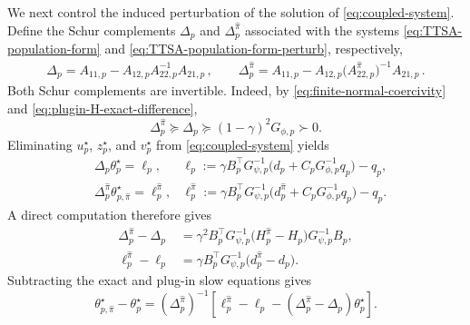 \documentclass{article}
\theoremstyle{definition}
\theoremstyle{remark}
\theoremstyle{plain}
\def\eqsp{\,}
\newcommand{\dsieve}{p}
\numberwithin{equation}{section}
\begin{document}
We next control the induced perturbation of the solution of
\eqref{eq:coupled-system}. Define the Schur complements \(\Delta_\dsieve\) and \(\Delta_\dsieve^{\widehat\pi}\) associated with the systems \eqref{eq:TTSA-population-form} and \eqref{eq:TTSA-population-form-perturb}, respectively,
\begin{align}
    \Delta_\dsieve = A_{11,\dsieve} - A_{12,\dsieve} A_{22, \dsieve}^{-1} A_{21,\dsieve}\eqsp, \qquad \Delta_\dsieve^{\widehat\pi} = A_{11,\dsieve} - A_{12,\dsieve} \big(A_{22, \dsieve}^{\widehat\pi}\big)^{-1} A_{21,\dsieve}\eqsp.
\end{align}
Both Schur complements are invertible. Indeed, by \eqref{eq:finite-normal-coercivity} and \eqref{eq:plugin-H-exact-difference}, 
\begin{equation}
\label{eq:plugin-Schur-stability}
    \Delta_\dsieve^{\widehat\pi}
    \succeq
    \Delta_\dsieve
    \succeq
    (1-\gamma)^2G_{\phi,\dsieve}
    \succ0.
\end{equation}
Eliminating \(u_\dsieve^\star\), \(z_\dsieve^\star\), and
\(v_\dsieve^\star\) from \eqref{eq:coupled-system} yields
\begin{align}
\label{eq:eliminated-slow-equation}
&\Delta_\dsieve\theta_\dsieve^\star
    =
    \ell_\dsieve,
    &\ell_\dsieve
    :=
    \gamma
    B_\dsieve^\top
    G_{\psi,\dsieve}^{-1}
    \bigl(
        d_\dsieve+C_\dsieve G_{\phi,\dsieve}^{-1}q_\dsieve
    \bigr)
    -
    q_\dsieve, \\ 
&\Delta_\dsieve^{\widehat\pi}
\theta_{\dsieve,\widehat\pi}^\star= \ell_\dsieve^{\widehat\pi}, &\ell_\dsieve^{\widehat \pi}
    :=
    \gamma
    B_\dsieve^\top
    G_{\psi,\dsieve}^{-1}
    \bigl(
        d_\dsieve^{\widehat\pi}+C_\dsieve G_{\phi,\dsieve}^{-1}q_\dsieve
    \bigr)
    -
    q_\dsieve.
\end{align}
A direct computation therefore gives
\begin{align}
\label{eq:plugin-Delta-identity}
    \Delta_\dsieve^{\widehat\pi}
    -
    \Delta_\dsieve
    &=
    \gamma^2
    B_\dsieve^\top
    G_{\psi,\dsieve}^{-1}
    \bigl(
        H_\dsieve^{\widehat\pi}-H_\dsieve
    \bigr)
    G_{\psi,\dsieve}^{-1}
    B_\dsieve,
    \\
\label{eq:plugin-ell-identity}
    \ell_\dsieve^{\widehat\pi}
    -
    \ell_\dsieve
    &=
    \gamma
    B_\dsieve^\top
    G_{\psi,\dsieve}^{-1}
    \bigl(
        d_\dsieve^{\widehat\pi}-d_\dsieve
    \bigr).
\end{align}
Subtracting the exact and plug-in slow equations gives
\[
    \theta_{\dsieve,\widehat\pi}^\star-\theta_\dsieve^\star
    =
    (\Delta_\dsieve^{\widehat\pi})^{-1}
    \left[
        \ell_{\dsieve}^{\widehat\pi}-\ell_\dsieve
        -
        (\Delta_\dsieve^{\widehat\pi}-\Delta_\dsieve)
        \theta_\dsieve^\star
    \right].
\]
\end{document}
